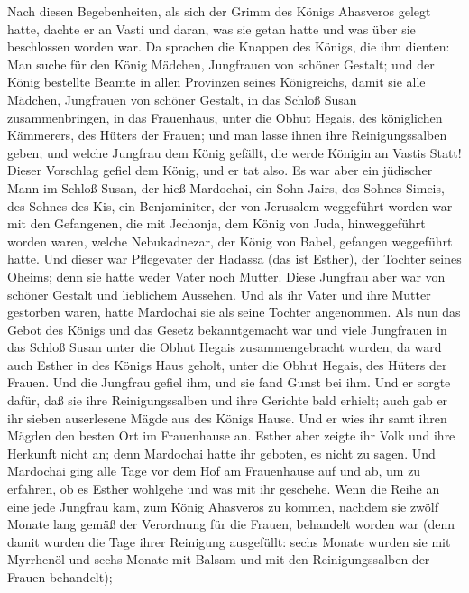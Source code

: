  Nach diesen Begebenheiten, als sich der Grimm des Königs
Ahasveros gelegt hatte, dachte er an Vasti und daran, was sie getan
hatte und was über sie beschlossen worden war.  Da
sprachen die Knappen des Königs, die ihm dienten: Man suche für den
König Mädchen, Jungfrauen von schöner Gestalt;  und der
König bestellte Beamte in allen Provinzen seines Königreichs, damit sie
alle Mädchen, Jungfrauen von schöner Gestalt, in das Schloß Susan
zusammenbringen, in das Frauenhaus, unter die Obhut Hegais, des
königlichen Kämmerers, des Hüters der Frauen; und man lasse ihnen ihre
Reinigungssalben geben;  und welche Jungfrau dem König
gefällt, die werde Königin an Vastis Statt! Dieser Vorschlag gefiel dem
König, und er tat also.  Es war aber ein jüdischer Mann im
Schloß Susan, der hieß Mardochai, ein Sohn Jairs, des Sohnes Simeis, des
Sohnes des Kis,  ein Benjaminiter, der von Jerusalem
weggeführt worden war mit den Gefangenen, die mit Jechonja, dem König
von Juda, hinweggeführt worden waren, welche Nebukadnezar, der König von
Babel, gefangen weggeführt hatte.  Und dieser war
Pflegevater der Hadassa (das ist Esther), der Tochter seines Oheims;
denn sie hatte weder Vater noch Mutter. Diese Jungfrau aber war von
schöner Gestalt und lieblichem Aussehen. Und als ihr Vater und ihre
Mutter gestorben waren, hatte Mardochai sie als seine Tochter
angenommen.  Als nun das Gebot des Königs und das Gesetz
bekanntgemacht war und viele Jungfrauen in das Schloß Susan unter die
Obhut Hegais zusammengebracht wurden, da ward auch Esther in des Königs
Haus geholt, unter die Obhut Hegais, des Hüters der Frauen.
 Und die Jungfrau gefiel ihm, und sie fand Gunst bei ihm.
Und er sorgte dafür, daß sie ihre Reinigungssalben und ihre Gerichte
bald erhielt; auch gab er ihr sieben auserlesene Mägde aus des Königs
Hause. Und er wies ihr samt ihren Mägden den besten Ort im Frauenhause
an.  Esther aber zeigte ihr Volk und ihre Herkunft nicht
an; denn Mardochai hatte ihr geboten, es nicht zu sagen. 
Und Mardochai ging alle Tage vor dem Hof am Frauenhause auf und ab, um
zu erfahren, ob es Esther wohlgehe und was mit ihr geschehe.
 Wenn die Reihe an eine jede Jungfrau kam, zum König
Ahasveros zu kommen, nachdem sie zwölf Monate lang gemäß der Verordnung
für die Frauen, behandelt worden war (denn damit wurden die Tage ihrer
Reinigung ausgefüllt: sechs Monate wurden sie mit Myrrhenöl und sechs
Monate mit Balsam und mit den Reinigungssalben der Frauen behandelt);
